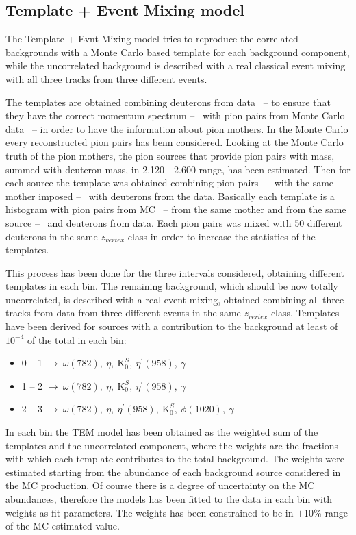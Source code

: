 %
\subsection{Template + Event Mixing model} \label{sec:tem}

The Template + Evnt Mixing model tries to reproduce the correlated backgrounds with a Monte Carlo
based template for each background component, while the uncorrelated background is described with a
real classical event mixing with all three tracks from three different events.

The templates are obtained combining deuterons from data \ -- to ensure that they have the correct
momentum spectrum -- \ with pion pairs from Monte Carlo data \ -- in order to have the information
about pion mothers.
In the Monte Carlo every reconstructed pion pairs has benn considered.
Looking at the Monte Carlo truth of the pion mothers, the pion sources that provide pion pairs with 
mass, summed with deuteron mass, in 2.120 - 2.600 \gevcs range, has been estimated.
Then for each source the template was obtained combining pion pairs \ -- with the same mother imposed
-- \ with deuterons from the data. 
Basically each template is a \minv histogram with pion pairs from MC \ -- from the same mother and 
from the same source -- \ and deuterons from data. 
Each pion pairs was mixed with 50 different deuterons in the same $z_{vertex}$ class in order to 
increase the statistics of the templates.

This process has been done for the three \pt intervals considered, obtaining different templates in 
each \pt bin.
The remaining background, which should be now totally uncorrelated, is described with a real event 
mixing, obtained combining all three tracks from data from three different events in the same 
$z_{vertex}$ class.
Templates have been derived for sources with a contribution to the background at least of $10^{-4}$ of
the total in each \pt bin:
\begin{itemize}
  \item[] 0 -- 1 \gevc $\rightarrow \ \omega(782),\ \eta,\ \mathrm K_{0}^{S},\ \eta^{'}(958),\ \gamma $
  \item[] 1 -- 2 \gevc $\rightarrow \ \omega(782),\ \eta,\ \mathrm K_{0}^{S},\ \eta^{'}(958),\ \gamma $
  \item[] 2 -- 3 \gevc $\rightarrow \ \omega(782),\ \eta,\ \eta^{'}(958),\ \mathrm K_{0}^{S},\ \phi(1020),\ \gamma $
\end{itemize}

In each \pt bin the TEM model has been obtained as the weighted sum of the templates and the
uncorrelated component, where the weights are the fractions with which each template contributes to
the total background.
The weights were estimated starting from the abundance of each background source considered in the MC
production.
Of course there is a degree of uncertainty on the MC abundances, therefore the models has been fitted
to the data in each
\pt bin with weights as fit parameters. The weights has been constrained to be in $\pm$10\% range of 
the MC estimated value.

